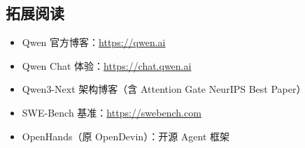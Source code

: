 \documentclass[a4paper]{article}
\begin{document}
\subsection{拓展阅读}

\begin{itemize}
    \item Qwen 官方博客：\url{https://qwen.ai}
    \item Qwen Chat 体验：\url{https://chat.qwen.ai}
    \item Qwen3-Next 架构博客（含 Attention Gate NeurIPS Best Paper）
    \item SWE-Bench 基准：\url{https://swebench.com}
    \item OpenHands（原 OpenDevin）：开源 Agent 框架
\end{itemize}

\end{document}
